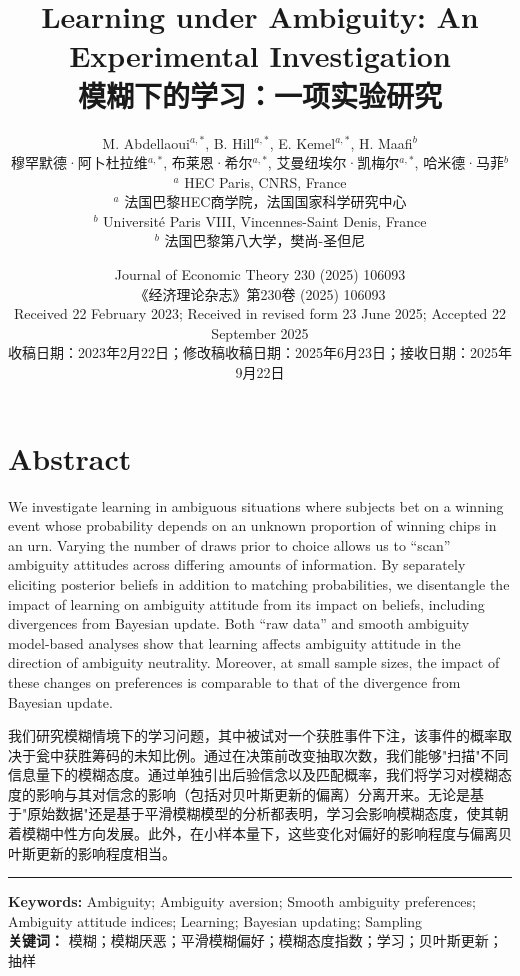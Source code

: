 \documentclass[12pt,a4paper]{article}
\title{\textbf{Learning under Ambiguity: An Experimental Investigation}\\[0.5em]
       {\Large\color{transblue}\textbf{模糊下的学习：一项实验研究}}
}
\author{%
  M. Abdellaoui$^{a,*}$, B. Hill$^{a,*}$, E. Kemel$^{a,*}$, H. Maafi$^{b}$ \\[0.5em]
  {\small\color{transblue}穆罕默德·阿卜杜拉维$^{a,*}$, 布莱恩·希尔$^{a,*}$, 艾曼纽埃尔·凯梅尔$^{a,*}$, 哈米德·马菲$^{b}$} \\[0.3em]
  \small $^a$ HEC Paris, CNRS, France \\
  {\small\color{transblue}$^a$ 法国巴黎HEC商学院，法国国家科学研究中心} \\
  \small $^b$ Universit\'{e} Paris VIII, Vincennes-Saint Denis, France \\
  {\small\color{transblue}$^b$ 法国巴黎第八大学，樊尚-圣但尼}
}
\date{%
  \small Journal of Economic Theory 230 (2025) 106093 \\[0.3em]
  {\small\color{transblue}《经济理论杂志》第230卷 (2025) 106093} \\[0.3em]
  \small Received 22 February 2023; Received in revised form 23 June 2025; Accepted 22 September 2025 \\[0.3em]
  {\small\color{transblue}收稿日期：2023年2月22日；修改稿收稿日期：2025年6月23日；接收日期：2025年9月22日}
}
\newenvironment{original}
  {\par\vspace{0.5em}\noindent\color{black}\ignorespaces}
  {\par\vspace{0.3em}}
\newenvironment{translation}
  {\par\noindent\color{transblue}\ignorespaces}
  {\par\vspace{0.8em}\hrule\vspace{0.5em}}
\begin{document}
\maketitle

\section*{Abstract}

\begin{original}
We investigate learning in ambiguous situations where subjects bet on a winning event whose probability depends on an unknown proportion of winning chips in an urn. Varying the number of draws prior to choice allows us to ``scan'' ambiguity attitudes across differing amounts of information. By separately eliciting posterior beliefs in addition to matching probabilities, we disentangle the impact of learning on ambiguity attitude from its impact on beliefs, including divergences from Bayesian update. Both ``raw data'' and smooth ambiguity model-based analyses show that learning affects ambiguity attitude in the direction of ambiguity neutrality. Moreover, at small sample sizes, the impact of these changes on preferences is comparable to that of the divergence from Bayesian update.
\end{original}

\begin{translation}
我们研究模糊情境下的学习问题，其中被试对一个获胜事件下注，该事件的概率取决于瓮中获胜筹码的未知比例。通过在决策前改变抽取次数，我们能够"扫描"不同信息量下的模糊态度。通过单独引出后验信念以及匹配概率，我们将学习对模糊态度的影响与其对信念的影响（包括对贝叶斯更新的偏离）分离开来。无论是基于"原始数据"还是基于平滑模糊模型的分析都表明，学习会影响模糊态度，使其朝着模糊中性方向发展。此外，在小样本量下，这些变化对偏好的影响程度与偏离贝叶斯更新的影响程度相当。
\end{translation}

\noindent\textbf{Keywords:} Ambiguity; Ambiguity aversion; Smooth ambiguity preferences; Ambiguity attitude indices; Learning; Bayesian updating; Sampling \\
{\color{transblue}\textbf{关键词：} 模糊；模糊厌恶；平滑模糊偏好；模糊态度指数；学习；贝叶斯更新；抽样}
\end{document}
